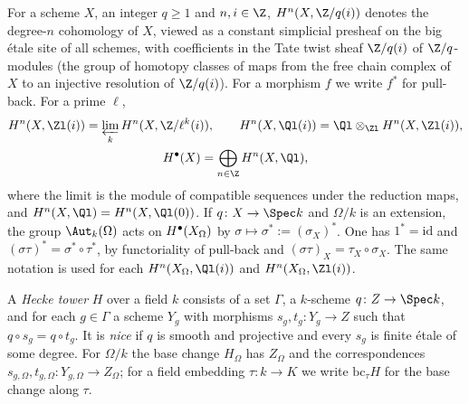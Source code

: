 \begin{definition}\label{def:pf:steps2:coh}
For a scheme $X$, an integer $q\ge1$ and $n,i\in\Z$, $H^n(X,\Z/q(i))$ denotes the degree-$n$
cohomology of $X$, viewed as a constant simplicial presheaf on the big \'etale site of all
schemes, with coefficients in the Tate twist sheaf $\Z/q(i)$ of $\Z/q$-modules (the group of
homotopy classes of maps from the free chain complex of $X$ to an injective resolution of
$\Z/q(i)$). For a morphism $f$ we write $f^\ast$ for pull-back. For a prime $\ell$,
\begin{gather*}
  H^n(X,\Zl(i))=\varprojlim_k H^n(X,\Z/\ell^k(i)),\qquad
  H^n(X,\Ql(i))=\Ql\otimes_{\Zl}H^n(X,\Zl(i)),\\
  \stepsiiH(X)=\bigoplus_{n\in\Z}H^n(X,\Ql),
\end{gather*}
where the limit is the module of compatible sequences under the reduction maps, and
$H^n(X,\Ql)=H^n(X,\Ql(0))$. If $q\colon X\to\Spec k$ and $\Omega/k$ is an extension, the group
$\Aut_k(\Omega)$ acts on $H^{\bullet}(X_\Omega)$ by $\sigma\mapsto\sigma^\ast:=(\sigma_X)^\ast$. One has
$1^\ast=\mathrm{id}$ and $(\sigma\tau)^\ast=\sigma^\ast\circ\tau^\ast$, by functoriality of pull-back
and $(\sigma\tau)_X=\tau_X\circ\sigma_X$. The same notation is used for each $H^n(X_\Omega,\Ql(i))$
and $H^n(X_\Omega,\Zl(i))$.
\end{definition}

\begin{definition}\label{def:pf:steps2:tower}
A \emph{Hecke tower} $H$ over a field $k$ consists of a set $\Gamma$, a $k$-scheme
$q\colon Z\to\Spec k$, and for each $g\in\Gamma$ a scheme $Y_g$ with morphisms
$s_g,t_g\colon Y_g\to Z$ such that $q\circ s_g=q\circ t_g$. It is \emph{nice} if $q$ is smooth and
projective and every $s_g$ is finite \'etale of some degree. For $\Omega/k$ the base change
$H_\Omega$ has $Z_\Omega$ and the correspondences $s_{g,\Omega},t_{g,\Omega}\colon Y_{g,\Omega}\to
Z_\Omega$; for a field embedding $\tau\colon k\to K$ we write $\mathrm{bc}_\tau H$ for the base change
along $\tau$.
\end{definition}

